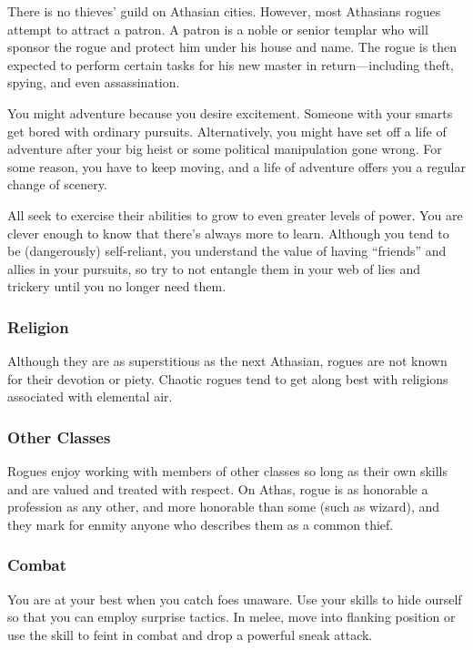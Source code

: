 There is no thieves' guild on Athasian cities. However, most Athasians rogues attempt to attract a patron. A patron is a noble or senior templar who will sponsor the rogue and protect him under his house and name. The rogue is then expected to perform certain tasks for his new master in return---including theft, spying, and even assassination.

You might adventure because you desire excitement. Someone with your smarts get bored with ordinary pursuits. Alternatively, you might have set off a life of adventure after your big heist or some political manipulation gone wrong. For some reason, you have to keep moving, and a life of adventure offers you a regular change of scenery.

All seek to exercise their abilities to grow to even greater levels of power. You are clever enough to know that there's always more to learn. Although you tend to be (dangerously) self-reliant, you understand the value of having ``friends'' and allies in your pursuits, so try to not entangle them in your web of lies and trickery until you no longer need them.

\subsubsection{Religion}
Although they are as superstitious as the next Athasian, rogues are not known for their devotion or piety. Chaotic rogues tend to get along best with religions associated with elemental air.

\subsubsection{Other Classes}

Rogues enjoy working with members of other classes so long as their own skills and are valued and treated with respect. On Athas, rogue is as honorable a profession as any other, and more honorable than some (such as wizard), and they mark for enmity anyone who describes them as a common thief.

\subsubsection{Combat}
You are at your best when you catch foes unaware. Use your skills to hide ourself so that you can employ surprise tactics. In melee, move into flanking position or use the  skill to feint in combat and drop a powerful sneak attack.


